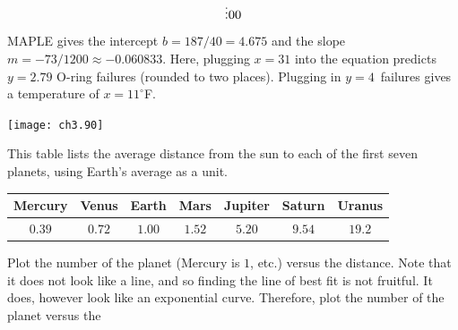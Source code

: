 \begin{exercises}
\begin{answer}
\begin{exparts}
\begin{equation*}
{%
                     \vdots \\
                     0 \\
                     0}
          \end{equation*}
          MAPLE gives the intercept $b=187/40=4.675$ and the 
          slope $m=-73/1200\approx -0.060833$.
          Here, plugging $x=31$ into the equation predicts 
          $y=2.79$ O-ring failures (rounded to two places).
          Plugging in $y=4$~failures gives a temperature of 
          $x=11^\circ$F.
     \begin{center}  \small
       \texttt{[image: ch3.90]}
      \end{center}
      \end{exparts}  
    \end{answer}
  \item 
     This table lists the average distance from the sun to
     each of the first seven planets, using Earth's average as a unit.
     \begin{center}
       \begin{tabular}{ccccccc}
         Mercury &Venus   &Earth   &Mars    &Jupiter &Saturn  &Uranus  \\ 
         \hline     
         $0.39$  &$0.72$  &$1.00$  &$1.52$  &$5.20$  &$9.54$  &$19.2$
       \end{tabular}
     \end{center}
    \begin{exparts}
      \partsitem Plot the number of the planet 
        (Mercury is \( 1 \), etc.) versus the distance.
        Note that it does not look like a line, and so finding the
        line of best fit is not fruitful.
      \partsitem It does, however look like an exponential curve. 
        Therefore, plot the number of the planet versus the

\end{exparts}
\end{exercises}
